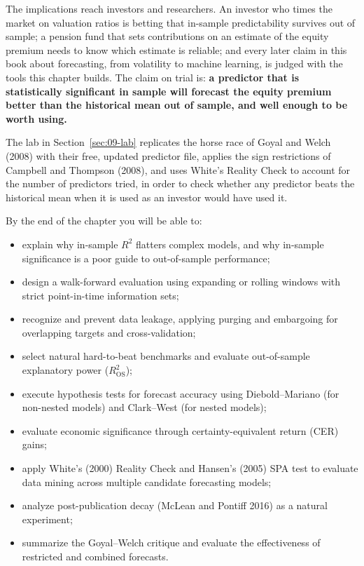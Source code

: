 The implications reach investors and researchers. An investor who times the market on valuation ratios is betting that in-sample predictability survives out of sample; a pension fund that sets contributions on an estimate of the equity premium needs to know which estimate is reliable; and every later claim in this book about forecasting, from volatility to machine learning, is judged with the tools this chapter builds. The claim on trial is: \textbf{a predictor that is statistically significant in sample will forecast the equity premium better than the historical mean out of sample, and well enough to be worth using.}

The lab in Section~\ref{sec:09-lab} replicates the horse race of Goyal and Welch (2008) with their free, updated predictor file, applies the sign restrictions of Campbell and Thompson (2008), and uses White's Reality Check to account for the number of predictors tried, in order to check whether any predictor beats the historical mean when it is used as an investor would have used it.

By the end of the chapter you will be able to:
\begin{itemize}
  \item explain why in-sample $R^2$ flatters complex models, and why in-sample significance is a poor guide to out-of-sample performance;
  \item design a walk-forward evaluation using expanding or rolling windows with strict point-in-time information sets;
  \item recognize and prevent data leakage, applying purging and embargoing for overlapping targets and cross-validation;
  \item select natural hard-to-beat benchmarks and evaluate out-of-sample explanatory power ($R^2_{\text{OS}}$);
  \item execute hypothesis tests for forecast accuracy using Diebold--Mariano (for non-nested models) and Clark--West (for nested models);
  \item evaluate economic significance through certainty-equivalent return (CER) gains;
  \item apply White's (2000) Reality Check and Hansen's (2005) SPA test to evaluate data mining across multiple candidate forecasting models;
  \item analyze post-publication decay (McLean and Pontiff 2016) as a natural experiment;
  \item summarize the Goyal--Welch critique and evaluate the effectiveness of restricted and combined forecasts.
\end{itemize}

